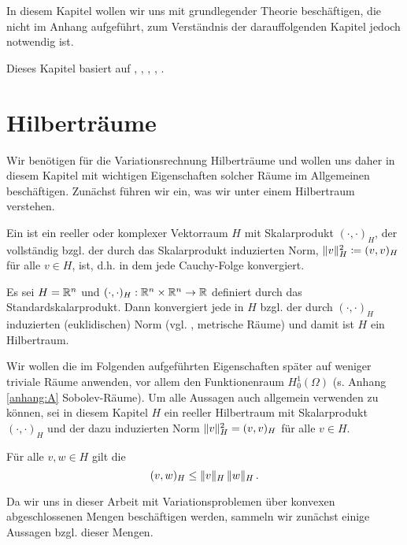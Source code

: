 \label{kap:2}

In diesem Kapitel wollen wir uns mit grundlegender Theorie beschäftigen, die nicht im Anhang aufgeführt, zum Verständnis der darauffolgenden Kapitel jedoch notwendig ist.

Dieses Kapitel basiert auf \cite{BraeFEM}, \cite{StarkePDE}, \cite{EPS}, \cite{Walker}, \cite{AltKonti}.


\section{Hilberträume}
\label{kap:2.1}


Wir benötigen für die Variationsrechnung Hilberträume und wollen uns daher in diesem Kapitel mit wichtigen Eigenschaften solcher Räume im Allgemeinen beschäftigen. Zunächst führen wir ein, was wir unter einem Hilbertraum verstehen.


\begin{defi}\label{def:2.1}
Ein \textit{} ist ein reeller oder komplexer Vektorraum $H$ mit Skalarprodukt $(\cdot, \cdot)_H$, der vollständig bzgl. der durch das Skalarprodukt induzierten Norm, $\lVert v\rVert_H^2 \coloneqq{(v,v)_H}$ für alle $v \in H$, ist, d.h. in dem jede Cauchy-Folge konvergiert.
\end{defi}


\begin{bsp*}
Es sei $H = \mathbb{R}^n$ und $(\cdot,\cdot)_H : \mathbb{R}^n\times \mathbb{R}^n \rightarrow \mathbb{R}$ definiert durch das Standardskalarprodukt. Dann konvergiert jede  in $H$ bzgl. der durch $(\cdot,\cdot)_H$ induzierten (euklidischen) Norm (vgl. \cite{Ana2}, metrische Räume) und damit ist $H$ ein Hilbertraum.
\end{bsp*}


Wir wollen die im Folgenden aufgeführten Eigenschaften später auf weniger triviale Räume anwenden, vor allem den Funktionenraum $H^1_0(\Omega)$ (s. Anhang \ref{anhang:A} Sobolev-Räume). Um alle Aussagen auch allgemein verwenden zu können, sei in diesem Kapitel $H$ ein reeller Hilbertraum mit Skalarprodukt $(\cdot,\cdot)_H$ und der dazu induzierten Norm $\lVert v\rVert_H^2 = (v,v)_H$ für alle $v \in H$.


\begin{bem*}
Für alle $v,w \in H$ gilt die 
\[
	(v,w)_H \le \lVert v\rVert_H \, \lVert w\rVert_H \, .
\]
\end{bem*}


Da wir uns in dieser Arbeit mit Variationsproblemen über konvexen abgeschlossenen Mengen beschäftigen werden, sammeln wir zunächst einige Aussagen bzgl. dieser Mengen.


